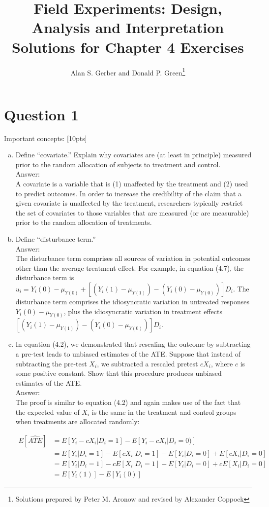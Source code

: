\documentclass[11pt,notitlepage]{article}\usepackage[]{graphicx}\usepackage[]{color}
\title{Field Experiments: Design, Analysis and Interpretation \\
Solutions for Chapter 4 Exercises}
\author{Alan S. Gerber and Donald P. Green\footnote{Solutions prepared by Peter M. Aronow and revised by Alexander Coppock}}
\date{\vspace{-5ex}}
\begin{document}
\maketitle


\section*{Question 1}
Important concepts: [10pts]

\begin{enumerate}[a)]
\item Define ``covariate.''  Explain why covariates are (at least in principle) measured prior to the random allocation of subjects to treatment and control.\\
Answer:\\
A covariate is a variable that is (1) unaffected by the treatment and (2) used to predict outcomes. In order to increase the credibility of the claim that a given covariate is unaffected by the treatment, researchers typically restrict the set of covariates to those variables that are measured (or are measurable) prior to the random allocation of treatments.

\item Define ``disturbance term.''  \\
Answer:\\
The disturbance term comprises all sources of variation in potential outcomes other than the average treatment effect.  For example, in equation (4.7), the disturbance term is $u_i=Y_i (0)-\mu_{Y(0)}+[(Y_i (1)-\mu_{Y(1)} )-(Y_i (0)-\mu_{Y(0)})] D_i$.  The disturbance term comprises the idiosyncratic variation in untreated responses $Y_i (0)-\mu_{Y(0)}$, plus the idiosyncratic variation in treatment effects $[(Y_i (1)-\mu_{Y(1)})-(Y_i (0)-\mu_{Y(0)})] D_i.$  

\item In equation (4.2), we demonstrated that rescaling the outcome by subtracting a pre-test leads to unbiased estimates of the ATE. Suppose that instead of subtracting the pre-test $X_i$, we subtracted a rescaled pretest $cX_i$, where $c$ is some positive constant.  Show that this procedure produces unbiased estimates of the ATE. \\
Answer:\\
The proof is similar to equation (4.2) and again makes use of the fact that the expected value of $X_i$ is the same in the treatment and control groups when treatments are allocated randomly:

\begin{align*}
E[\widehat{ATE}] &=E[Y_i-cX_i |D_i=1]-E[Y_i-cX_i | D_i=0)]\\
&= E[Y_i|D_i=1]-E[cX_i|D_i=1]-E[Y_i|D_i=0]+E[cX_i|D_i=0]\\
&= E[Y_i|D_i=1]-cE[X_i|D_i=1]-E[Y_i|D_i=0]+cE[X_i|D_i=0]\\
&= E[Y_i(1)] - E[Y_i(0)]
\end{align*}


\end{enumerate}
\end{document}
